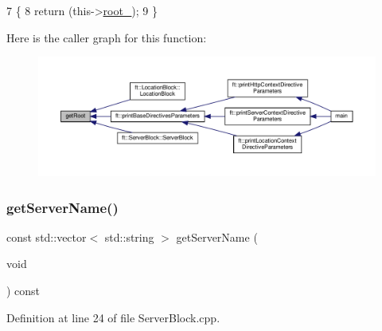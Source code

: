 \begin{DoxyCode}
7     \{
8         \textcolor{keywordflow}{return} (this->\hyperlink{classft_1_1_base_directives_abb1eaf0bba10b90172d6152e69457dc7}{root\_});
9     \}
\end{DoxyCode}
Here is the caller graph for this function\+:
\nopagebreak
\begin{figure}[H]
\begin{center}
\leavevmode
\includegraphics[width=350pt]{classft_1_1_base_directives_aa5dbcb08bda0a0e7e502d2df7cf64287_icgraph}
\end{center}
\end{figure}
\mbox{\label{classft_1_1_server_block_aa14d06f644ee8148fa9e2ee53d9625f9}} 
\subsubsection{\texorpdfstring{get\+Server\+Name()}{getServerName()}}
{\footnotesize\ttfamily const std\+::vector$<$ std\+::string $>$ get\+Server\+Name (\begin{DoxyParamCaption}\item[{void}]{ }\end{DoxyParamCaption}) const}



Definition at line 24 of file Server\+Block.\+cpp.


